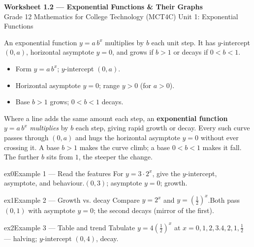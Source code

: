 \documentclass[11pt]{article}
\begin{document}
\begin{center}
{\LARGE\bfseries\color{titleblue}Worksheet 1.2 --- Exponential Functions \& Their Graphs}\\[2pt]
{\small Grade 12 Mathematics for College Technology (MCT4C) \textperiodcentered{} Unit 1: Exponential Functions}
\end{center}

\begin{ideabox}
An exponential function $y=a\,b^{x}$ multiplies by $b$ each unit step. It has $y$-intercept $(0,a)$, horizontal asymptote $y=0$, and grows if $b>1$ or decays if $0<b<1$.
\begin{itemize}[leftmargin=*,itemsep=2pt]
  \item Form $y=a\,b^{x}$; $y$-intercept $(0,a)$.
  \item Horizontal asymptote $y=0$; range $y>0$ (for $a>0$).
  \item Base $b>1$ grows; $0<b<1$ decays.
\end{itemize}
\end{ideabox}

\begin{learnbox}
Where a line adds the same amount each step, an \textbf{exponential function} $y=a\,b^x$ \emph{multiplies} by $b$ each step, giving rapid growth or decay.
Every such curve passes through $(0,a)$ and hugs the horizontal asymptote $y=0$ without ever crossing it.
A base $b>1$ makes the curve climb; a base $0<b<1$ makes it fall. The further $b$ sits from $1$, the steeper the change.
\end{learnbox}


\begin{example}{ex0}{Example 1 --- Read the features}
For $y=3\cdot2^{x}$, give the $y$-intercept, asymptote, and behaviour.\soln $(0,3)$; asymptote $y=0$; growth.
\end{example}

\begin{example}{ex1}{Example 2 --- Growth vs. decay}
Compare $y=2^{x}$ and $y=\left(\tfrac12\right)^{x}$.\soln Both pass $(0,1)$ with asymptote $y=0$; the second decays (mirror of the first).
\end{example}

\begin{example}{ex2}{Example 3 --- Table and trend}
Tabulate $y=4\left(\tfrac12\right)^{x}$ at $x=0,1,2,3$.\soln $4,2,1,\tfrac12$ — halving; $y$-intercept $(0,4)$, decay.
\end{example}
\end{document}
